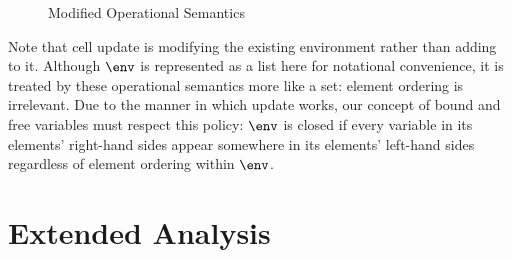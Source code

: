 \documentclass[nocopyright]{sigplanconf}
\begin{document}
\begin{figure}
\begin{mathpar}

    \end{mathpar}
    \caption{Modified Operational Semantics}
    \label{fig_operationalSemanticsModified}
\end{figure}

Note that cell update is modifying the existing environment rather than adding to it.  Although $\env$ is represented as a list here for notational convenience, it is treated by these operational semantics more like a set: element ordering is irrelevant.  Due to the manner in which update works, our concept of bound and free variables must respect this policy: $\env$ is closed if every variable in its elements' right-hand sides appear somewhere in its elements' left-hand sides regardless of element ordering within $\env$.


\section{Extended Analysis}
\end{document}
